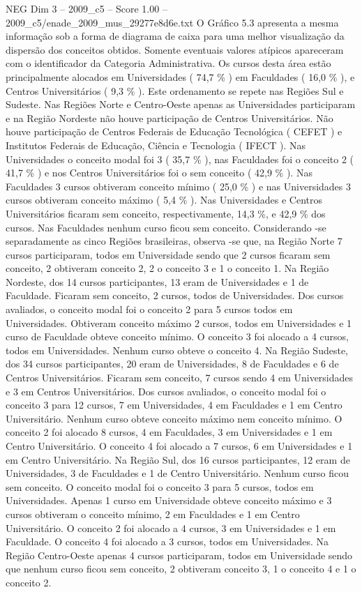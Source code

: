 \begin{textsample}{NEG Dim 3 – 2009\_c5 – Score 1.00 – 2009\_c5/enade\_2009\_mus\_29277e8d6e.txt}
O Gráfico 5.3 apresenta a mesma informação sob a forma de diagrama de caixa para uma melhor visualização da dispersão dos conceitos obtidos.
Somente eventuais valores atípicos apareceram com o identificador da Categoria Administrativa.
Os cursos desta área estão principalmente alocados em Universidades ( 74,7 \% ) em Faculdades ( 16,0 \% ), e Centros Universitários ( 9,3 \% ).
Este ordenamento se repete nas Regiões Sul e Sudeste.
Nas Regiões Norte e Centro-Oeste apenas as Universidades participaram e na Região Nordeste não houve participação de Centros Universitários.
Não houve participação de Centros Federais de Educação Tecnológica ( CEFET ) e Institutos Federais de Educação, Ciência e Tecnologia ( IFECT ).
Nas Universidades o conceito modal foi 3 ( 35,7 \% ), nas Faculdades foi o conceito 2 ( 41,7 \% ) e nos Centros Universitários foi o sem conceito ( 42,9 \% ).
Nas Faculdades 3 cursos obtiveram conceito mínimo ( 25,0 \% ) e nas Universidades 3 cursos obtiveram conceito máximo ( 5,4 \% ).
Nas Universidades e Centros Universitários ficaram sem conceito, respectivamente, 14,3 \%, e 42,9 \% dos cursos.
Nas Faculdades nenhum curso ficou sem conceito.
Considerando -se separadamente as cinco Regiões brasileiras, observa -se que, na Região Norte 7 cursos participaram, todos em Universidade sendo que 2 cursos ficaram sem conceito, 2 obtiveram conceito 2, 2 o conceito 3 e 1 o conceito 1.
Na Região Nordeste, dos 14 cursos participantes, 13 eram de Universidades e 1 de Faculdade.
Ficaram sem conceito, 2 cursos, todos de Universidades.
Dos cursos avaliados, o conceito modal foi o conceito 2 para 5 cursos todos em Universidades.
Obtiveram conceito máximo 2 cursos, todos em Universidades e 1 curso de Faculdade obteve conceito mínimo.
O conceito 3 foi alocado a 4 cursos, todos em Universidades.
Nenhum curso obteve o conceito 4.
Na Região Sudeste, dos 34 cursos participantes, 20 eram de Universidades, 8 de Faculdades e 6 de Centros Universitários.
Ficaram sem conceito, 7 cursos sendo 4 em Universidades e 3 em Centros Universitários.
Dos cursos avaliados, o conceito modal foi o conceito 3 para 12 cursos, 7 em Universidades, 4 em Faculdades e 1 em Centro Universitário.
Nenhum curso obteve conceito máximo nem conceito mínimo.
O conceito 2 foi alocado 8 cursos, 4 em Faculdades, 3 em Universidades e 1 em Centro Universitário.
O conceito 4 foi alocado a 7 cursos, 6 em Universidades e 1 em Centro Universitário.
Na Região Sul, dos 16 cursos participantes, 12 eram de Universidades, 3 de Faculdades e 1 de Centro Universitário.
Nenhum curso ficou sem conceito.
O conceito modal foi o conceito 3 para 5 cursos, todos em Universidades.
Apenas 1 curso em Universidade obteve conceito máximo e 3 cursos obtiveram o conceito mínimo, 2 em Faculdades e 1 em Centro Universitário.
O conceito 2 foi alocado a 4 cursos, 3 em Universidades e 1 em Faculdade.
O conceito 4 foi alocado a 3 cursos, todos em Universidades.
Na Região Centro-Oeste apenas 4 cursos participaram, todos em Universidade sendo que nenhum curso ficou sem conceito, 2 obtiveram conceito 3, 1 o conceito 4 e 1 o conceito 2.

\end{textsample}
